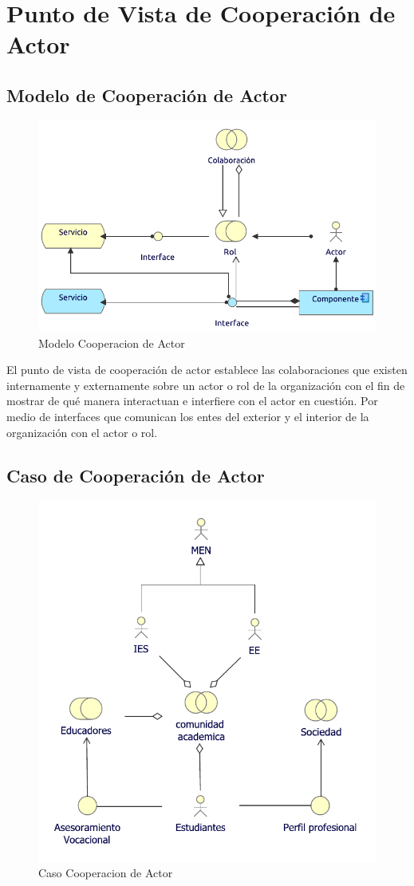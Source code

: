 \section{Punto de Vista de Cooperación de Actor}


\subsection{Modelo de Cooperación de Actor}
\begin{figure}[h!]
	\centering
	\includegraphics[width=.6\linewidth]{imgs/modelo/CoopActor.pdf}
	\caption{Modelo Cooperacion de Actor}
\end{figure}

El punto de vista de cooperación de actor establece las colaboraciones que existen internamente y externamente sobre un actor o rol de la organización con el fin de mostrar de qué manera interactuan e interfiere con el actor en cuestión. Por medio de interfaces  que comunican los entes del exterior y el interior de la organización con el actor o rol.

\newpage
\subsection{Caso  de Cooperación de Actor}
\begin{figure}[h!]
	\centering
	\includegraphics[width=.8\linewidth]{imgs/caso/negocio/coperacion_actor.pdf}
	\caption{Caso Cooperacion de Actor}
\end{figure}

